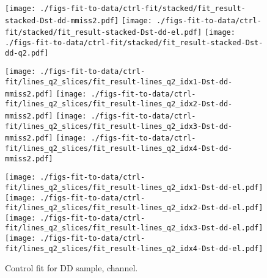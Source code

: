 \begin{figure}[htb]
    \centering
    \texttt{[image: ./figs-fit-to-data/ctrl-fit/stacked/fit\_result-stacked-Dst-dd-mmiss2.pdf]}
    \texttt{[image: ./figs-fit-to-data/ctrl-fit/stacked/fit\_result-stacked-Dst-dd-el.pdf]}
    \texttt{[image: ./figs-fit-to-data/ctrl-fit/stacked/fit\_result-stacked-Dst-dd-q2.pdf]}

    \texttt{[image: ./figs-fit-to-data/ctrl-fit/lines\_q2\_slices/fit\_result-lines\_q2\_idx1-Dst-dd-mmiss2.pdf]}
    \texttt{[image: ./figs-fit-to-data/ctrl-fit/lines\_q2\_slices/fit\_result-lines\_q2\_idx2-Dst-dd-mmiss2.pdf]}
    \texttt{[image: ./figs-fit-to-data/ctrl-fit/lines\_q2\_slices/fit\_result-lines\_q2\_idx3-Dst-dd-mmiss2.pdf]}
    \texttt{[image: ./figs-fit-to-data/ctrl-fit/lines\_q2\_slices/fit\_result-lines\_q2\_idx4-Dst-dd-mmiss2.pdf]}

    \texttt{[image: ./figs-fit-to-data/ctrl-fit/lines\_q2\_slices/fit\_result-lines\_q2\_idx1-Dst-dd-el.pdf]}
    \texttt{[image: ./figs-fit-to-data/ctrl-fit/lines\_q2\_slices/fit\_result-lines\_q2\_idx2-Dst-dd-el.pdf]}
    \texttt{[image: ./figs-fit-to-data/ctrl-fit/lines\_q2\_slices/fit\_result-lines\_q2\_idx3-Dst-dd-el.pdf]}
    \texttt{[image: ./figs-fit-to-data/ctrl-fit/lines\_q2\_slices/fit\_result-lines\_q2\_idx4-Dst-dd-el.pdf]}

    \caption{Control fit for DD sample, \Dstar channel.}
    \label{fig:ctrl-dd-dst}
\end{figure}

